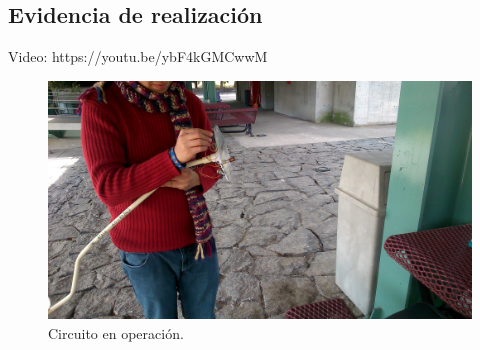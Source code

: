 
\subsection{Evidencia de realizaci\'on}
Video: https://youtu.be/ybF4kGMCwwM

\begin{figure}[!htbp]
\caption{Circuito en operaci\'on.}
\centering
\includegraphics [scale=0.10]
{./img/DSC_0011.JPG}
\end{figure}

 \pagebreak